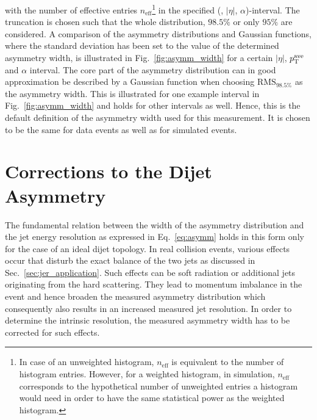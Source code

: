 with the number of effective entries $n_\mathrm{eff}$\footnote{In case of an unweighted histogram, $n_\mathrm{eff}$ is equivalent to the number of histogram entries. However, for a weighted histogram, \eg in simulation, $n_\mathrm{eff}$ corresponds to the hypothetical number of unweighted entries a histogram would need in order to have the same statistical power as the weighted histogram.} in the specified (\ptave, $|\eta|$, $\alpha$)-interval. The truncation is chosen such that the whole distribution, $98.5\%$ or only $95\%$ are considered. A comparison of the asymmetry distributions and Gaussian functions, where the standard deviation has been set to the value of the determined asymmetry width, is illustrated in Fig.~\ref{fig:asymm_width} for a certain $|\eta|$, $p_{\text{T}}^\mathrm{ave}$ and $\alpha$ interval. The core part of the asymmetry distribution can in good approximation be described by a Gaussian function when choosing $\mathrm{RMS}_{98.5\%}$ as the asymmetry width. This is illustrated for one example interval in Fig.~\ref{fig:asymm_width} and holds for other intervals as well. Hence, this is the default definition of the asymmetry width used for this measurement. It is chosen to be the same for data events as well as for simulated events.  

\section{Corrections to the Dijet Asymmetry}
\label{sec:jer_corrections}
The fundamental relation between the width of the asymmetry distribution and the jet energy resolution as expressed in Eq.~\ref{eq:asymm} holds in this form only for the case of an ideal dijet topology. In real collision events, various effects occur that disturb the exact balance of the two jets as discussed in Sec.~\ref{sec:jer_application}. Such effects can be soft radiation or additional jets originating from the hard scattering. They lead to momentum imbalance in the event and hence broaden the measured asymmetry distribution which consequently also results in an increased measured jet resolution. In order to determine the intrinsic resolution, the measured asymmetry width has to be corrected for such effects.

